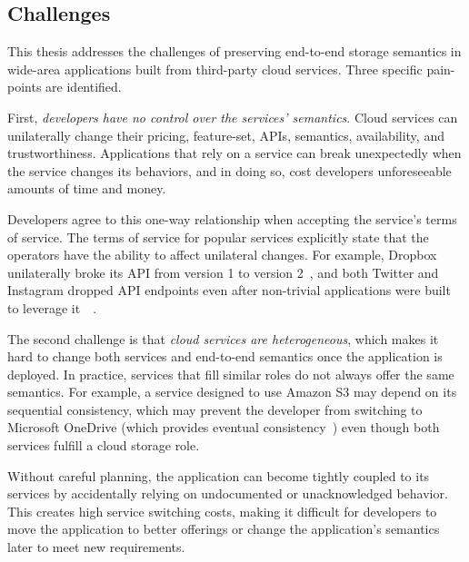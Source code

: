 \subsection{Challenges}

This thesis addresses the challenges of preserving end-to-end storage semantics
in wide-area applications built from third-party cloud services.  Three specific
pain-points are identified.

First, \emph{developers have no control over the services' semantics}.
Cloud services can unilaterally
change their pricing, feature-set, APIs, semantics, availability, and
trustworthiness.  Applications that rely on a service can break unexpectedly
when the service changes its behaviors, and in doing so,
cost developers unforeseeable amounts of time and money.

Developers agree to this one-way relationship when accepting the service's terms of service.  The terms of
service for popular services explicitly state that the operators have the ability to affect unilateral
changes.  For example, Dropbox unilaterally broke its API from version 1 to version
2~\cite{dropbox-v2-api-psa}, and both Twitter and Instagram dropped API
endpoints even after non-trivial
applications were built to leverage
it~\cite{twitter-api-deprecation-psa}~\cite{instagram-api-drop}. %

The second challenge is that \emph{cloud services are heterogeneous}, which
makes it hard to change both services and end-to-end semantics once the application is deployed.
In practice, services that fill similar roles do not always offer the same semantics.
For example, a service designed to use Amazon S3 may 
depend on its sequential consistency, which may prevent the developer from
switching to Microsoft OneDrive (which provides eventual
consistency~\cite{consistency-comparison-cloud-storage}) even though both
services fulfill a cloud storage role.   %

Without careful planning, the application can become tightly coupled
to its services by accidentally relying on undocumented or unacknowledged
behavior.  This creates high service switching costs, making it
difficult for developers to move the application to better
offerings or change the application's semantics later to meet new requirements.

